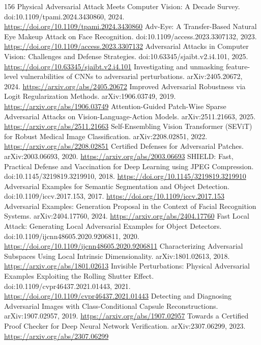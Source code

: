 \documentclass[11pt]{article}
\begin{document}
\begin{thebibliography}{156}
 Physical Adversarial Attack Meets Computer Vision: A Decade Survey. doi:10.1109/tpami.2024.3430860, 2024. \url{https://doi.org/10.1109/tpami.2024.3430860}
 Adv-Eye: A Transfer-Based Natural Eye Makeup Attack on Face Recognition. doi:10.1109/access.2023.3307132, 2023. \url{https://doi.org/10.1109/access.2023.3307132}
 Adversarial Attacks in Computer Vision: Challenges and Defense Strategies. doi:10.63345/sjaibt.v2.i4.101, 2025. \url{https://doi.org/10.63345/sjaibt.v2.i4.101}
 Investigating and unmasking feature-level vulnerabilities of CNNs to adversarial perturbations. arXiv:2405.20672, 2024. \url{https://arxiv.org/abs/2405.20672}
 Improved Adversarial Robustness via Logit Regularization Methods. arXiv:1906.03749, 2019. \url{https://arxiv.org/abs/1906.03749}
 Attention-Guided Patch-Wise Sparse Adversarial Attacks on Vision-Language-Action Models. arXiv:2511.21663, 2025. \url{https://arxiv.org/abs/2511.21663}
 Self-Ensembling Vision Transformer (SEViT) for Robust Medical Image Classification. arXiv:2208.02851, 2022. \url{https://arxiv.org/abs/2208.02851}
 Certified Defenses for Adversarial Patches. arXiv:2003.06693, 2020. \url{https://arxiv.org/abs/2003.06693}
 SHIELD: Fast, Practical Defense and Vaccination for Deep Learning using JPEG Compression. doi:10.1145/3219819.3219910, 2018. \url{https://doi.org/10.1145/3219819.3219910}
 Adversarial Examples for Semantic Segmentation and Object Detection. doi:10.1109/iccv.2017.153, 2017. \url{https://doi.org/10.1109/iccv.2017.153}
 Adversarial Examples: Generation Proposal in the Context of Facial Recognition Systems. arXiv:2404.17760, 2024. \url{https://arxiv.org/abs/2404.17760}
 Fast Local Attack: Generating Local Adversarial Examples for Object Detectors. doi:10.1109/ijcnn48605.2020.9206811, 2020. \url{https://doi.org/10.1109/ijcnn48605.2020.9206811}
 Characterizing Adversarial Subspaces Using Local Intrinsic Dimensionality. arXiv:1801.02613, 2018. \url{https://arxiv.org/abs/1801.02613}
 Invisible Perturbations: Physical Adversarial Examples Exploiting the Rolling Shutter Effect. doi:10.1109/cvpr46437.2021.01443, 2021. \url{https://doi.org/10.1109/cvpr46437.2021.01443}
 Detecting and Diagnosing Adversarial Images with Class-Conditional Capsule Reconstructions. arXiv:1907.02957, 2019. \url{https://arxiv.org/abs/1907.02957}
 Towards a Certified Proof Checker for Deep Neural Network Verification. arXiv:2307.06299, 2023. \url{https://arxiv.org/abs/2307.06299}

\end{thebibliography}
\end{document}
